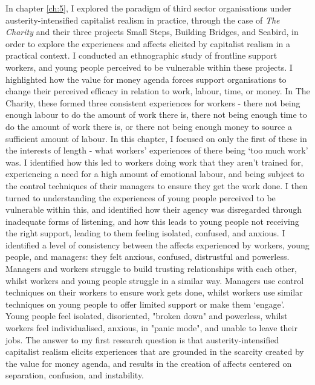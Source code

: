 In chapter \ref{ch:5}, I explored the paradigm of third sector organisations under austerity-intensified capitalist realism in practice, through the case of \textit{The Charity} and their three projects Small Steps, Building Bridges, and Seabird, in order to explore the experiences and affects elicited by capitalist realism in a practical context. I conducted an ethnographic study of frontline support workers, and young people perceived to be vulnerable within these projects. I highlighted how the value for money agenda forces support organisations to change their perceived efficacy in relation to work, labour, time, or money. In The Charity, these formed three consistent experiences for workers - there not being enough labour to do the amount of work there is, there not being enough time to do the amount of work there is, or there not being enough money to source a sufficient amount of labour. In this chapter, I focused on only the first of these in the interests of length - what workers' experiences of there being `too much work' was. I identified how this led to workers doing work that they aren't trained for, experiencing a need for a high amount of emotional labour, and being subject to the control techniques of their managers to ensure they get the work done. I then turned to understanding the experiences of young people perceived to be vulnerable within this, and identified how their agency was disregarded through inadequate forms of listening, and how this leads to young people not receiving the right support, leading to them feeling isolated, confused, and anxious. I identified a level of consistency between the affects experienced by workers, young people, and managers: they felt anxious, confused, distrustful and powerless. Managers and workers struggle to build trusting relationships with each other, whilst workers and young people struggle in a similar way. Managers use control techniques on their workers to ensure work gets done, whilst workers use similar techniques on young people to offer limited support or make them `engage'. Young people feel isolated, disoriented, "broken down" and powerless, whilst workers feel individualised, anxious, in "panic mode", and unable to leave their jobs. The answer to my first research question is that austerity-intensified capitalist realism elicits experiences that are grounded in the scarcity created by the value for money agenda, and results in the creation of affects centered on separation, confusion, and instability.

